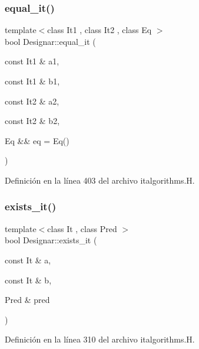 \subsubsection{\texorpdfstring{equal\+\_\+it()}{equal\_it()}\hspace{0.1cm}{\footnotesize\ttfamily [2/2]}}
{\footnotesize\ttfamily template$<$class It1 , class It2 , class Eq $>$ \\
bool Designar\+::equal\+\_\+it (\begin{DoxyParamCaption}\item[{const It1 \&}]{a1,  }\item[{const It1 \&}]{b1,  }\item[{const It2 \&}]{a2,  }\item[{const It2 \&}]{b2,  }\item[{Eq \&\&}]{eq = {\ttfamily Eq()} }\end{DoxyParamCaption})}



Definición en la línea 403 del archivo italgorithms.\+H.

\mbox{\label{namespace_designar_a65348ae854999f031477dcc97f6a4865}} 
\subsubsection{\texorpdfstring{exists\+\_\+it()}{exists\_it()}\hspace{0.1cm}{\footnotesize\ttfamily [1/2]}}
{\footnotesize\ttfamily template$<$class It , class Pred $>$ \\
bool Designar\+::exists\+\_\+it (\begin{DoxyParamCaption}\item[{const It \&}]{a,  }\item[{const It \&}]{b,  }\item[{Pred \&}]{pred }\end{DoxyParamCaption})}



Definición en la línea 310 del archivo italgorithms.\+H.

\mbox{\label{namespace_designar_abac7b042ab21f3b7e1359cbec17b5e96}} 
